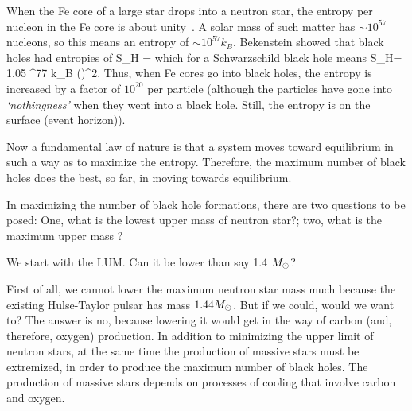 \documentclass[aps,twocolumn,preprintnumbers,%
superscriptaddress,floatfix]{revtex4}
\begin{document}
When the Fe core of a large star drops into a neutron star, the entropy per nucleon in the Fe core is about unity~\cite{Bet79}. A solar mass of such matter has $\sim 10^{57}$ nucleons, so this means an entropy of $\sim 10^{57} k_B$.  Bekenstein \cite{Bec73} showed that black holes had entropies of
\be
S_H =  \times {}
\ee
which for a Schwarzschild black hole means
\be
S_H= 1.05 ^{77} k_B \left(\right)^{2}.
\ee
Thus, when Fe cores go into black holes, the entropy is increased by a factor of $10^{20}$ per particle (although the particles have gone into {\it `nothingness'} when they went into a black hole. Still, the entropy is on the surface (event horizon)).

Now a fundamental law of nature is that a system moves toward equilibrium in such a way as to maximize the entropy. Therefore,  the maximum number of black holes does the best, so far, in moving towards equilibrium.


In maximizing the number of black hole formations, there are two questions to be posed: One,  what is the lowest upper mass of neutron star?; two,  what is the maximum upper mass ?

We start with the LUM. Can it be lower than say 1.4 $\mbox{$M_\odot$}$?

First of all,  we cannot lower the maximum neutron star mass much because the existing Hulse-Taylor pulsar has mass $1.44\mbox{$M_\odot$}$. But if we could, would we want to? The answer is no, because lowering it would get in the way of carbon (and, therefore, oxygen) production. In addition to minimizing the upper limit of neutron stars, at the same time the production of massive stars must be extremized, in order to produce the maximum number of black holes. The production of massive stars depends on processes of cooling that involve carbon and oxygen.
%
\end{document}
